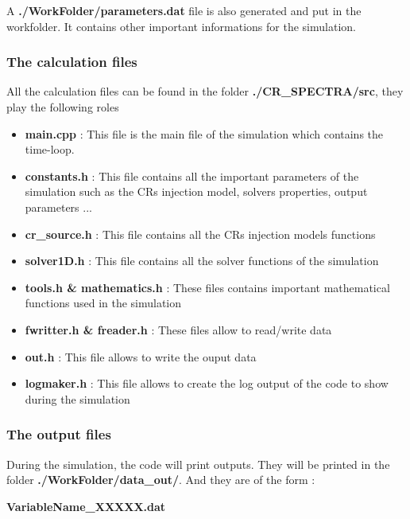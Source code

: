             A {\bf{./WorkFolder/parameters.dat}} file is also generated and put in the workfolder. It contains other important informations for the simulation. 

        \subsubsection{The calculation files}

            All the calculation files can be found in the folder {\bf{./CR\_SPECTRA/src}}, they play the following roles 

            \begin{itemize}
                \item {\bf{main.cpp}} : This file is the main file of the simulation which contains the time-loop. 
                \item {\bf{constants.h}} : This file contains all the important parameters of the simulation such as the CRs injection model, solvers properties, output 
                                            parameters ... 
                \item {\bf{cr\_source.h}} : This file contains all the CRs injection models functions
                \item {\bf{solver1D.h}} : This file contains all the solver functions of the simulation 
                \item {\bf{tools.h \& mathematics.h}} : These files contains important mathematical functions used in the simulation
                \item {\bf{fwritter.h \& freader.h}} : These files allow to read/write data 
                \item {\bf{out.h}} : This file allows to write the ouput data 
                \item {\bf{logmaker.h}} : This file allows to create the log output of the code to show during the simulation 
            \end{itemize}
            

        \subsubsection{The output files}

            During the simulation, the code will print outputs. They will be printed in the folder {\bf{./WorkFolder/data\_out/}}. And they 
            are of the form : 

            \begin{center}
                {\bf{VariableName\_XXXXX.dat}}
            \end{center}

